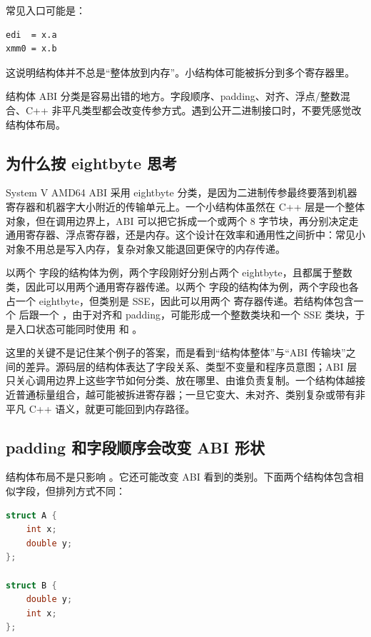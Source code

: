 常见入口可能是：

\begin{lstlisting}
edi  = x.a
xmm0 = x.b
\end{lstlisting}

这说明结构体并不总是“整体放到内存”。小结构体可能被拆分到多个寄存器里。

\begin{warningbox}
结构体 ABI 分类是容易出错的地方。字段顺序、padding、对齐、浮点/整数混合、C++ 非平凡类型都会改变传参方式。遇到公开二进制接口时，不要凭感觉改结构体布局。
\end{warningbox}

\subsection{为什么按 eightbyte 思考}

System V AMD64 ABI 采用 eightbyte 分类，是因为二进制传参最终要落到机器寄存器和机器字大小附近的传输单元上。一个小结构体虽然在 C++ 层是一个整体对象，但在调用边界上，ABI 可以把它拆成一个或两个 8 字节块，再分别决定走通用寄存器、浮点寄存器，还是内存。这个设计在效率和通用性之间折中：常见小对象不用总是写入内存，复杂对象又能退回更保守的内存传递。

以两个  字段的结构体为例，两个字段刚好分别占两个 eightbyte，且都属于整数类，因此可以用两个通用寄存器传递。以两个  字段的结构体为例，两个字段也各占一个 eightbyte，但类别是 SSE，因此可以用两个  寄存器传递。若结构体包含一个  后跟一个 ，由于对齐和 padding，可能形成一个整数类块和一个 SSE 类块，于是入口状态可能同时使用  和 。

这里的关键不是记住某个例子的答案，而是看到“结构体整体”与“ABI 传输块”之间的差异。源码层的结构体表达了字段关系、类型不变量和程序员意图；ABI 层只关心调用边界上这些字节如何分类、放在哪里、由谁负责复制。一个结构体越接近普通标量组合，越可能被拆进寄存器；一旦它变大、未对齐、类别复杂或带有非平凡 C++ 语义，就更可能回到内存路径。

\subsection{padding 和字段顺序会改变 ABI 形状}

结构体布局不是只影响 。它还可能改变 ABI 看到的类别。下面两个结构体包含相似字段，但排列方式不同：

\begin{lstlisting}[language=C++]
struct A {
    int x;
    double y;
};

struct B {
    double y;
    int x;
};
\end{lstlisting}

